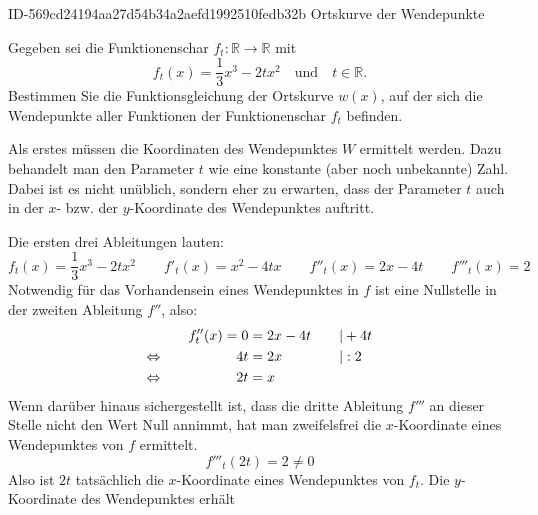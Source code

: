 \begin{exercise}
      {ID-569cd24194aa27d54b34a2aefd1992510fedb32b}
      {Ortskurve der Wendepunkte}
  \ifproblem\problem\par
    Gegeben sei die Funktionenschar
    $f_t:\mathbb{R}\to\mathbb{R}$ mit
    \begin{equation*}
      f_t(x)=\frac{1}{3}x^3-2tx^2
      \quad\text{und}\quad
      t\in\mathbb{R}.
    \end{equation*}
    Bestimmen Sie die Funktionsgleichung der
    Ortskurve $w(x)$, auf der sich die
    Wendepunkte aller Funktionen der
    Funktionenschar $f_t$ befinden.
  \fi
  \ifoutcome\outcome\par
    Als erstes müssen die Koordinaten des
    Wendepunktes $W$ ermittelt werden.
    Dazu behandelt man den Parameter $t$
    wie eine konstante (aber noch unbekannte)
    Zahl. Dabei ist es nicht unüblich, sondern
    eher zu erwarten, dass der Parameter $t$
    auch in der $x$- bzw. der $y$-Koordinate
    des Wendepunktes auftritt.
    \par
    Die ersten drei Ableitungen lauten:
    \begin{equation*}
        f_t(x)=\frac{1}{3}x^3-2tx^2
        \qquad
        f'_t(x)=x^2-4tx
        \qquad
        f''_t(x)=2x-4t
        \qquad
        f'''_t(x)=2
    \end{equation*}
    Notwendig für das Vorhandensein eines
    Wendepunktes in $f$ ist eine Nullstelle
    in der zweiten Ableitung $f''$, also:
    \begin{alignat*}{3}
      \relax&\quad
      &
      f''_t(x)=0&=2x-4t
      &
      \quad&|+4t
      \\
      \Leftrightarrow&\quad
      &
      4t&=2x
      &
      \quad&|:2
      \\
      \Leftrightarrow&\quad
      &
      2t&=x
      &
      \quad&\relax
    \end{alignat*}
    Wenn darüber hinaus sichergestellt ist,
    dass die dritte Ableitung $f'''$ an dieser
    Stelle nicht den Wert Null annimmt, hat
    man zweifelsfrei die $x$-Koordinate eines
    Wendepunktes von $f$ ermittelt.
    \begin{equation*}
      f'''_t(2t)=2\neq0
    \end{equation*}
    Also ist $2t$ tatsächlich die $x$-Koordinate
    eines Wendepunktes von $f_t$.
    Die $y$-Koordinate des Wendepunktes erhält

\end{exercise}
